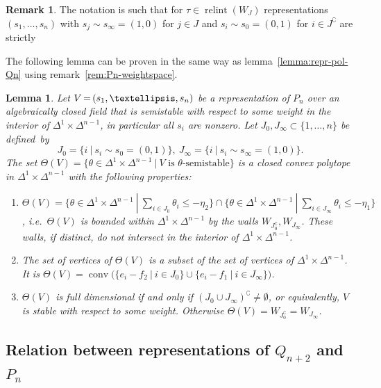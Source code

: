 \documentclass[10pt,a4paper]{amsart}
\newcommand{\ie}{i.e.\ }
\newtheorem{lemma}[theo]{Lemma}
\theoremstyle{definition}
\newtheorem{rema}[theo]{Remark}
\DeclareMathOperator{\conv}{conv}
\DeclareMathOperator{\relint}{relint}
\newcommand*{\Mk}{\mkern -2mu}
\begin{document}
\begin{rema}
The notation is such that for $\tau\in\relint(W_J)$ representations
$(s_1,\ldots,s_n)$ with $s_j\sim s_\infty=(1,0)$ for $j\in J$ and
$s_i\sim s_0=(0,1)$ for $i\in J^\complement$ are strictly %
{}
\end{rema}

The following lemma can be proven in the same way as lemma~\ref{lemma:repr-pol-Qn} 
using remark~\ref{rem:Pn-weightspace}.

\begin{lemma}\label{lemma:repr-pol-Pn}
Let $V\Mk = \Mk (s_1,\ldots,s_n)$ be a representation of $P_n$ over an algebraically closed 
field that is semistable with respect to some weight in the interior of %
$\Delta^1\times\Delta^{n-1}$, in particular all $s_i$ are nonzero.
Let $J_0,J_\infty\subset\{1,\ldots,n\}$ be defined~by 
\[
J_0=\{i\:|\:s_i\sim s_0=(0,1)\},\ J_\infty=\{i\:|\:s_i\sim s_\infty=(1,0)\}.
\] The set 
$\Theta(V)=\{\theta\in\Delta^1\times\Delta^{n-1}\:|\:\text{$V$ is $\theta$-semistable}\}$
is a closed convex polytope in $\Delta^1\times\Delta^{n-1}$ with the following 
properties:
\begin{enumerate}[label=(\alph*)]
\item\label{lemma2.6_1} $\Theta(V)=\{\theta\in\Delta^1\times\Delta^{n-1}\:|\:
\sum_{i\in J_0}\theta_i\leq-\eta_2\}
\cap\{\theta\in\Delta^1\times\Delta^{n-1}\:|\:\sum_{i\in J_\infty}\theta_i\leq-\eta_1\}$,
\ie $\Theta(V)$ is bounded within $\Delta^1\times\Delta^{n-1}$ by the walls 
$W_{\!J_0^\complement},W_{J_\infty}$. These walls, if distinct, do not intersect in 
the interior of $\Delta^1\times\Delta^{n-1}$.
\item\label{lemma2.6_2} The set of vertices of $\Theta(V)$ is a subset of the set of vertices of 
$\Delta^1\times\Delta^{n-1}$. 
It is $\Theta(V)=
\conv\big(\{e_i-f_2\:|\:i\in J_0\}\cup\{e_i-f_1\:|\:i\in J_\infty\}\big)$.
\item\label{lemma2.6_3} $\Theta(V)$ is full dimensional if and only if 
$(J_0\cup J_\infty)^\complement\neq\emptyset$, or equivalently, $V$ 
is stable with respect to some weight. Otherwise 
$\Theta(V)=W_{\!J_0^\complement}=W_{J_\infty}$.
\end{enumerate}
\end{lemma}



\subsection{Relation between representations of \texorpdfstring{$Q_{n+2}$}{Qn+2} and \texorpdfstring{$P_n$}{Pn}}
\label{subsec:Qn+2-Pn}
\end{document}
